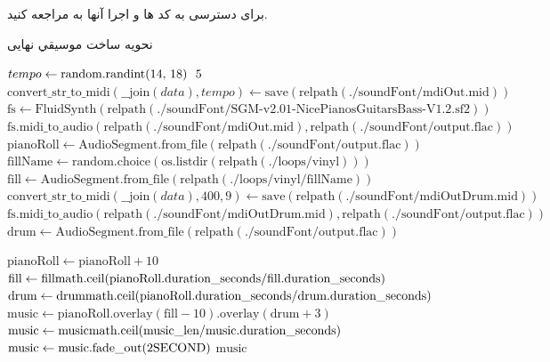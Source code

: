 برای دسترسی به کد ها و اجرا آنها به  مراجعه کنید.

\begin{LTR}
      \begin{algorithm}[H]
            \caption{نحویه ساخت موسیقي نهایی}
            \label{algo:lofi_music}
            \setmainfont{Times New Roman}
            \begin{algorithmic}[1]
                  \State $tempo \gets \text{random.randint(14, 18) \* 5}$ 
                  \State $\text{convert\_str\_to\_midi}(\text{\_\_join}(data), tempo) \gets \text{save}(\text{relpath}(\text{./soundFont/mdiOut.mid}))$ 
                  \State $\text{fs} \gets \text{FluidSynth}(\text{relpath}(\text{./soundFont/SGM-v2.01-NicePianosGuitarsBass-V1.2.sf2}))$ 
                  \State $\text{fs.midi\_to\_audio}(\text{relpath}(\text{./soundFont/mdiOut.mid}), \text{relpath}(\text{./soundFont/output.flac}))$ 
                  \State $\text{pianoRoll} \gets \text{AudioSegment.from\_file}(\text{relpath}(\text{./soundFont/output.flac}))$ 
                  \State $\text{fillName} \gets \text{random.choice}(\text{os.listdir}(\text{relpath}(\text{./loops/vinyl})))$ 
                  \State $\text{fill} \gets \text{AudioSegment.from\_file}(\text{relpath}(\text{./loops/vinyl/}\text{fillName}))$ 
                  \State $\text{convert\_str\_to\_midi}(\text{\_\_join}(data), 400, 9) \gets \text{save}(\text{relpath}(\text{./soundFont/mdiOutDrum.mid}))$ 
                  \State $\text{fs.midi\_to\_audio}(\text{relpath}(\text{./soundFont/mdiOutDrum.mid}), \text{relpath}(\text{./soundFont/output.flac}))$ 
                  \State $\text{drum} \gets \text{AudioSegment.from\_file}(\text{relpath}(\text{./soundFont/output.flac}))$ 
                  \EndProcedure

                  \State $\text{pianoRoll} \gets \text{pianoRoll} + 10$ 
                  \State $\text{fill} \gets \text{fill} \* \text{math.ceil}(\text{pianoRoll.duration\_seconds} / \text{fill.duration\_seconds})$ 
                  \State $\text{drum} \gets \text{drum} \* \text{math.ceil}(\text{pianoRoll.duration\_seconds} / \text{drum.duration\_seconds})$ 
                  \State $\text{music} \gets \text{pianoRoll}\text{.overlay}(\text{fill} - 10)\text{.overlay}(\text{drum} + 3)$ 
                  \State $\text{music} \gets \text{music} \* \text{math.ceil}(\text{music\_len} / \text{music.duration\_seconds})$ 
                  \State $\text{music} \gets \text{music.fade\_out}(2 \* \text{SECOND})$ 
                  \State \Return $\text{music}$
                  \EndProcedure
            \end{algorithmic}
      \end{algorithm}
\end{LTR}

